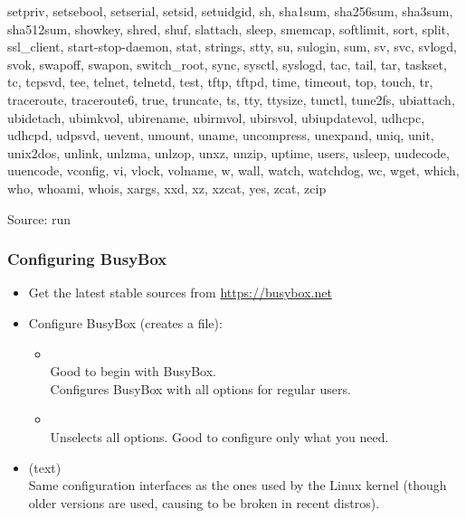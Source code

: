 \begin{frame}
\begin{spacing}{0}
{setpriv, setsebool, setserial, setsid, setuidgid, sh, sha1sum,
sha256sum, sha3sum, sha512sum, showkey, shred, shuf, slattach, sleep,
smemcap, softlimit, sort, split, ssl_client, start-stop-daemon, stat,
strings, stty, su, sulogin, sum, sv, svc, svlogd, svok, swapoff, swapon,
switch_root, sync, sysctl, syslogd, tac, tail, tar, taskset, tc, tcpsvd,
tee, telnet, telnetd, test, tftp, tftpd, time, timeout, top, touch, tr,
traceroute, traceroute6, true, truncate, ts, tty, ttysize, tunctl,
tune2fs, ubiattach, ubidetach, ubimkvol, ubirename, ubirmvol, ubirsvol,
ubiupdatevol, udhcpc, udhcpd, udpsvd, uevent, umount, uname, uncompress, unexpand, uniq,
unit, unix2dos, unlink, unlzma, unlzop, unxz, unzip, uptime, users,
usleep, uudecode, uuencode, vconfig, vi, vlock, volname, w, wall, watch,
watchdog, wc, wget, which, who, whoami, whois, xargs, xxd, xz, xzcat,
yes, zcat, zcip}
  \end{spacing}
  \vfill
  Source: run 
\end{frame}

\begin{frame}
  \frametitle{Configuring BusyBox}
  \begin{itemize}
  \item Get the latest stable sources from \url{https://busybox.net}
  \item Configure BusyBox (creates a  file):
    \begin{itemize}
    \item {}\\
      Good to begin with BusyBox.\\
      Configures BusyBox with all options for regular users.
    \item {}\\
      Unselects all options. Good to configure only what you need.
    \end{itemize}
  \item {} (text)\\
    Same configuration interfaces as the ones used by the Linux kernel
    (though older versions are used, causing  to
    be broken in recent distros).
  \end{itemize}
\end{frame}

